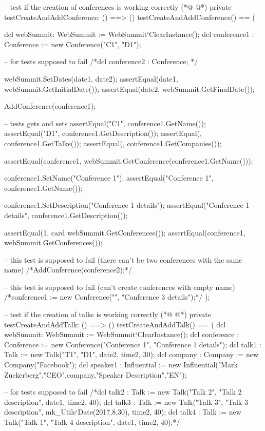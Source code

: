 \begin{vdmpp}[breaklines=true]
 -- test if the creation of conferences is working correctly
(*@
\label{testCreateAndAddConference:72}
@*)
 private testCreateAndAddConference: () ==> ()
 testCreateAndAddConference() == (
 
  dcl webSummit: WebSummit := WebSummit`ClearInstance();
  dcl conference1 : Conference := new Conference("C1", "D1");
  
  -- for tests supposed to fail
  /*dcl conference2 : Conference; */
  
  webSummit.SetDates(date1, date2);
  assertEqual(date1, webSummit.GetInitialDate());
  assertEqual(date2, webSummit.GetFinalDate());
  
  AddConference(conference1);

   -- tests gets and sets
  assertEqual("C1", conference1.GetName());
  assertEqual("D1", conference1.GetDescription());
  assertEqual({}, conference1.GetTalks());
  assertEqual({}, conference1.GetCompanies());
  
  assertEqual(conference1, webSummit.GetConference(conference1.GetName()));
  
  conference1.SetName("Conference 1");
  assertEqual("Conference 1", conference1.GetName());
  
  conference1.SetDescription("Conference 1 details");
  assertEqual("Conference 1 details", conference1.GetDescription());
  
  assertEqual(1, card webSummit.GetConferences());
  assertEqual({conference1}, webSummit.GetConferences());
  
  -- this test is supposed to fail (there can't be two conferences with the same name)
  /*AddConference(conference2);*/
  
  -- this test is supposed to fail (can't create conferences with empty name)
  /*conference1 := new Conference("", "Conference 3 details");*/
 );
 
 -- test if the creation of talks is working correctly
(*@
\label{testCreateAndAddTalk:112}
@*)
 private testCreateAndAddTalk: () ==> ()
 testCreateAndAddTalk() == (
  dcl webSummit: WebSummit := WebSummit`ClearInstance();
  dcl conference : Conference := new Conference("Conference 1", "Conference 1 details");
  dcl talk1 : Talk := new Talk("T1", "D1", date2, time2, 30);
  dcl company : Company := new Company("Facebook");
  dcl speaker1 : Influential := new Influential("Mark Zuckerberg","CEO",company,"Speaker Description","EN");
  
  -- for tests supposed to fail
  /*dcl talk2 : Talk := new Talk("Talk 2", "Talk 2 description", date1, time2, 40);
  dcl talk3 : Talk := new Talk("Talk 3", "Talk 3 description", mk_Utils`Date(2017,8,30), time2, 40);
  dcl talk4 : Talk := new Talk("Talk 1", "Talk 4 description", date1, time2, 40);*/
  

\end{vdmpp}
